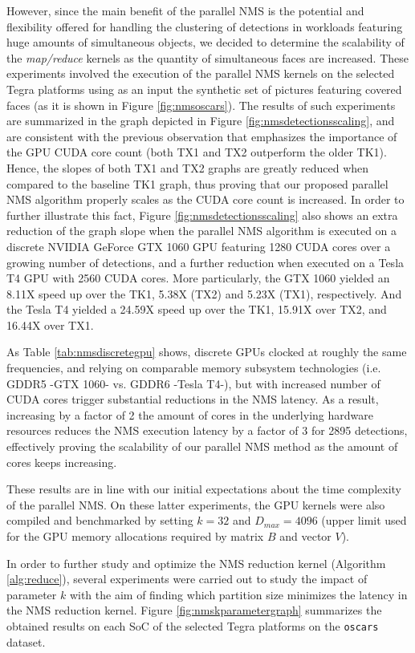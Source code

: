 However, since the main benefit of the parallel NMS is the potential and flexibility offered for handling the 
clustering of detections in workloads featuring huge amounts of simultaneous objects, we decided to 
determine the scalability of the \emph{map/reduce} kernels as the quantity of simultaneous faces are increased. These 
experiments involved the execution of the parallel NMS kernels on the selected Tegra platforms using as an input the synthetic 
set of pictures featuring covered faces (as it is shown in Figure \ref{fig:nmsoscars}). The results of such experiments 
are summarized in the graph depicted in Figure \ref{fig:nmsdetectionsscaling}, and are consistent with the previous observation 
that emphasizes the importance of the GPU CUDA core count (both TX1 and TX2 outperform the older TK1). Hence, the slopes 
of both TX1 and TX2 graphs are greatly reduced when compared to the baseline TK1 graph, thus proving that our proposed parallel 
NMS algorithm properly scales as the CUDA core count is increased. In order to further illustrate this fact, Figure 
\ref{fig:nmsdetectionsscaling} also shows an extra reduction of the graph slope when the parallel NMS algorithm is executed on 
a discrete NVIDIA GeForce GTX 1060 GPU featuring 1280 CUDA cores over a growing number of detections, and a further reduction 
when executed on a Tesla T4 GPU with 2560 CUDA cores. More particularly, the GTX 1060 yielded an 8.11X speed up over the TK1, 
5.38X (TX2) and 5.23X (TX1), respectively. And the Tesla T4 yielded a 24.59X speed up over the TK1, 15.91X over TX2, and 
16.44X over TX1.

As Table \ref{tab:nmsdiscretegpu} shows, discrete GPUs clocked at roughly the same frequencies, and relying on comparable memory
subsystem technologies (i.e. GDDR5 -GTX 1060- vs. GDDR6 -Tesla T4-), but with increased number of CUDA cores trigger substantial
reductions in the NMS latency. As a result, increasing by a factor of 2 the amount of cores in the underlying hardware resources
reduces the NMS execution latency by a factor of 3 for 2895 detections, effectively proving the scalability of our parallel NMS
method as the amount of cores keeps increasing.

These results are in line with our initial expectations about the time complexity of the parallel NMS. On these latter experiments, the GPU kernels 
were also compiled and benchmarked by setting $k=32$ and $D_{max}=4096$ (upper limit used for the GPU memory allocations required 
by matrix $B$ and vector $V$). 

In order to further study and optimize the NMS reduction kernel (Algorithm \ref{alg:reduce}), several experiments were carried 
out to study the impact of parameter $k$ with the aim of finding which partition size minimizes the latency in the NMS 
reduction kernel. Figure \ref{fig:nmskparametergraph} summarizes the obtained results on each SoC of the selected 
Tegra platforms on the \texttt{oscars} dataset.

